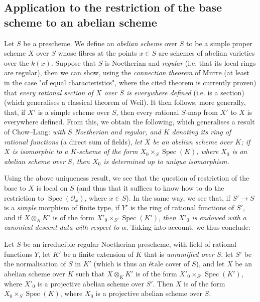 \subsection{Application to the restriction of the base scheme to an abelian scheme}\label{fga3.i-b.5}

Let $S$ be a prescheme.
We define an \emph{abelian scheme} over $S$ to be a simple proper scheme $X$ over $S$ whose fibres at the points $x\in S$ are schemes of abelian varieties over the $k(x)$.
Suppose that $S$ is Noetherian and \emph{regular} (i.e. that its local rings are regular), then we can show, using the \emph{connection theorem} of Murre \cite{Mur1958} (at least in the case "of equal characteristics", where the cited theorem is currently proven) that \emph{every rational section of $X$ over $S$ is everywhere defined} (i.e. is a section) (which generalises a classical theorem of Weil).
It then follows, more generally, that, if $X'$ is a simple scheme over $S$, then every rational $S$-map from $X'$ to $X$ is everywhere defined.
From this, we obtain the following, which generalises a result of Chow–Lang:
\emph{with $S$ Noetherian and regular, and $K$ denoting its ring of rational functions} (a direct sum of fields), \emph{let $X$ be an abelian scheme over $K$; if $X$ is isomorphic to a $K$-scheme of the form $X_0\times_S\operatorname{Spec}(K)$, where $X_0$ is an abelian scheme over $S$, then $X_0$ is determined up to unique isomorphism.}


Using the above uniqueness result, we see that the question of restriction of the base to $X$ is local on $S$ (and thus that it suffices to know how to do the restriction to $\operatorname{Spec}(\mathcal{O}_x)$, where $x\in S$).
In the same way, we see that, if $S'\to S$ is a \emph{simple} morphism of finite type, if $Y'$ is the ring of rational functions of $S'$, and if $X\otimes_K K'$ is of the form $X'_0\times_{S'}\operatorname{Spec}(K')$, \emph{then $X'_0$ is endowed with a canonical descent data with respect to $\alpha$}.
Taking  into account, we thus conclude:

\begin{proposition}\label{fga3.i-b.5-proposition-5.1}
    Let $S$ be an irreducible regular Noetherian prescheme, with field of rational functions $Y$, let $K'$ be a finite extension of $K$ that is \emph{unramified over $S$}, let $S'$ be the normalisation of $S$ in $K'$ (which is thus an étale cover of $S$), and let $X$ be an abelian scheme over $K$ such that $X\otimes_K K'$ is of the form $X'_0\times_{S'}\operatorname{Spec}(K')$, where $X'_0$ is a projective abelian scheme over $S'$.
    Then $X$ is of the form $X_0\times_S\operatorname{Spec}(K)$, where $X_0$ is a projective abelian scheme over $S$.
\end{proposition}

